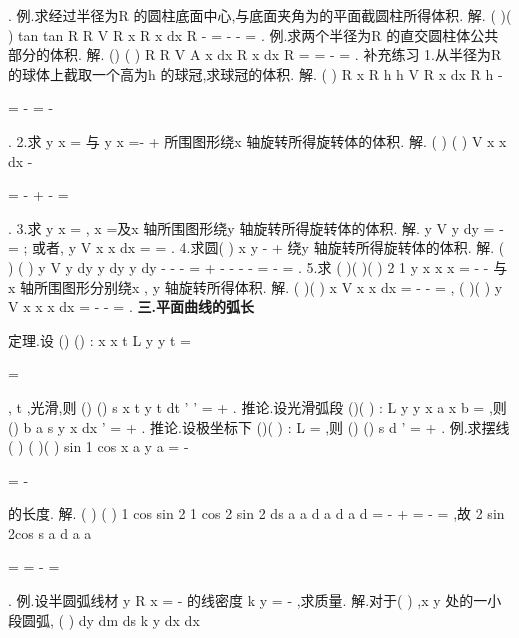 \int 
\int 
. 
\textcolor{lyred}{例}.求经过半径为R 的圆柱底面中心,与底面夹角为\alpha 的平面截圆柱所得体积. 
解.
(
)(
)
tan
tan
R
R
V
R
x
R
x
dx
R
\alpha 
\alpha 
-
=
-
-
=
\int 
. 
\textcolor{lyred}{例}.求两个半径为R 的直交圆柱体公共部分的体积. 
解.
()
(
)
R
R
V
A x dx
R
x
dx
R
=
=
-
=
\int 
\int 
. 
\textcolor{lyred}{补充练习 }
1.从半径为R 的球体上截取一个高为h 的球冠,求球冠的体积. 
解.
(
)
R
x
R h
h
V
R
x
dx
R
h
\pi 
\pi 
-


=
-
=
-




\int 
. 
2.求
y
x
=
与
y
x
=-
+
所围图形绕x 轴旋转所得旋转体的体积. 
解.
(
)
(
)
V
x
x
dx
\pi 
\pi 
-


=
-
+
-
=




\int 
. 
3.求
y
x
=
,
x =及x 轴所围图形绕y 轴旋转所得旋转体的体积. 
解.
y
V
y dy
\pi 
\pi 
\pi 
=
-
=
\int 
; 或者,
y
V
x x dx
\pi 
\pi 
=
\cdots 
=
\int 
. 
4.求圆(
)
x
y
-
+
\le 
绕y 轴旋转所得旋转体的体积. 
解.
(
)
(
)
y
V
y
dy
y
dy
y dy
\pi 
\pi 
\pi 
\pi 
-
-
-
=
+
-
-
-
-
=
-
=
\int 
\int 
\int 
. 
5.求
(
)(
)(
)
2 1
y
x
x
x
=
-
-
\le 
\le 
与x 轴所围图形分别绕x , y 轴旋转所得体积. 
解.
(
)(
)
x
V
x
x
dx
\pi 
\pi 
=
-
-
=
\int 
,
(
)(
)
y
V
x x
x dx
\pi 
\pi 
=
-
-
=
\int 
. 
\vspace{4pt}
{\bfseries \textcolor{lyred}{三.平面曲线的弧长}}

\textcolor{lyred}{定理}.设
()
()
: x
x t
L
y
y t
=

=

,
t
\alpha 
\beta 
\le \le 
,光滑,则
()
()
s
x t
y t
dt
\beta 
\alpha 
'
'
=
+
\int 
. 
\textcolor{lyred}{推论}.设光滑弧段
()(
)
:
L y
y x
a
x
b
=
\le 
\le 
,则
()
b
a
s
y
x dx
'
=
+
\int 
. 
\textcolor{lyred}{推论}.设极坐标下
()(
)
:
L \rho 
\rho \theta 
\alpha 
\theta 
\beta 
=
\le 
\le 
,则
()
()
s
d
\beta 
\alpha 
\rho 
\theta 
\rho 
\theta 
\theta 
'
=
+
\int 
. 
\textcolor{lyred}{例}.求摆线
(
)
(
)(
)
sin
1 cos
x
a
y
a
\theta 
\theta 
\theta 
\pi 
\theta 
=
-

\le 
\le 

=
-

的长度. 
解.
(
)
(
)
1 cos
sin
2 1 cos
2 sin 2
ds
a
a
d
a
d
a
d
\theta 
\theta 
\theta \theta 
\theta 
\theta 
\theta 
=
-
+
=
-
=
,故 
2 sin
2cos
s
a
d
a
a
\pi 
\pi 
\theta 
\theta 
\theta 


=
=
-
=




\int 
. 
\textcolor{lyred}{例}.设半圆弧线材
y
R
x
=
-
的线密度
k
y
\rho =
-
,求质量. 
解.对于(
)
,x y 处的一小段圆弧,
(
)
dy
dm
ds
k
y
dx
dx
\rho 


